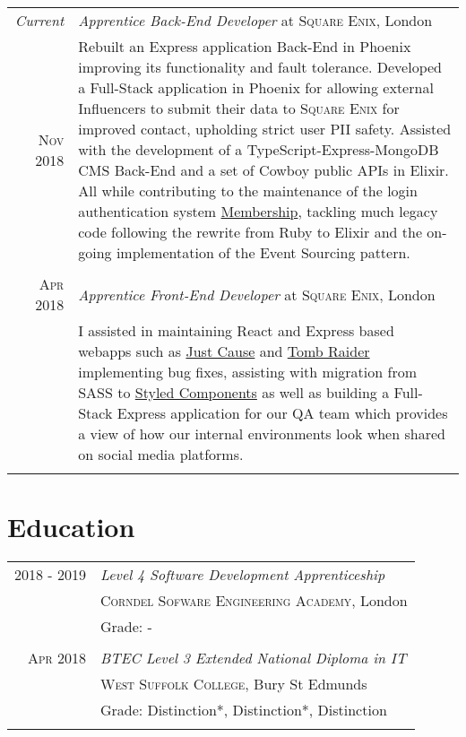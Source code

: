 \documentclass[a4paper,10pt]{article}
\begin{document}
\begin{tabular}{r|p{11cm}}
    \emph{Current} & \textit{Apprentice Back-End Developer} at \textsc{Square Enix}, London\\
    \textsc{Nov 2018} &\footnotesize{Rebuilt an Express application Back-End in Phoenix improving its functionality and 
    fault tolerance. Developed a Full-Stack application in Phoenix for allowing external Influencers to submit their data to 
    \textsc{Square Enix} for improved contact, upholding strict user PII safety. Assisted with the development of a 
    TypeScript-Express-MongoDB CMS Back-End and a set of Cowboy public APIs in Elixir. All while contributing to the maintenance of the 
    login authentication system \href{https://membership.square-enix-games.com}{Membership}, tackling much legacy code 
    following the rewrite from Ruby to Elixir and the on-going implementation of the Event Sourcing pattern.} \\
    \multicolumn{2}{c}{} \\
    
    \textsc{Apr 2018} & \textit{Apprentice Front-End Developer} at \textsc{Square Enix}, London\\
    &\footnotesize{I assisted in maintaining React and Express based webapps such as 
    \href{https://justcause.square-enix-games.com}{Just Cause} and \href{https://tombraider.square-enix-games.com}{Tomb Raider}
    implementing bug fixes, assisting with migration from SASS to \href{https://www.styled-components.com/}{Styled Components}
    as well as building a Full-Stack Express application for our QA team which provides a view of how our internal 
    environments look when shared on social media platforms.}\\
    \multicolumn{2}{c}{} \\
\end{tabular}

\section{Education}


\begin{tabular}{r|p{11cm}}
    \textsc{2018 - 2019} & \textit{Level 4 Software Development Apprenticeship}\\
    &\textsc{Corndel Sofware Engineering Academy}, London\\
    &\footnotesize{Grade: -}\\
    \multicolumn{2}{c}{} \\
    
    \textsc{Apr 2018} & \textit{BTEC Level 3 Extended National Diploma in IT}\\
    &\textsc{West Suffolk College}, Bury St Edmunds\\
    &\footnotesize{Grade: Distinction*, Distinction*, Distinction}\\
    \multicolumn{2}{c}{} \\
\end{tabular}
\end{document}
